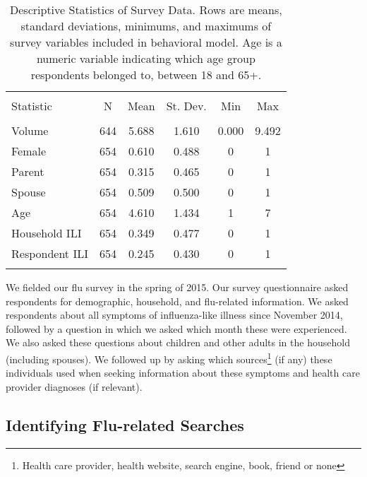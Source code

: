 \documentclass[fleqn,10pt]{wlscirep}
\begin{document}
\begin{table}[!htbp] \centering
\begin{tabular}{@{\extracolsep{5pt}}lccccc}
\\[-1.8ex]\hline
\hline \\[-1.8ex]
Statistic & \multicolumn{1}{c}{N} & \multicolumn{1}{c}{Mean} & \multicolumn{1}{c}{St. Dev.} & \multicolumn{1}{c}{Min} & \multicolumn{1}{c}{Max} \\
\hline \\[-1.8ex]
Volume & 644 & 5.688 & 1.610 & 0.000 & 9.492 \\
Female & 654 & 0.610 & 0.488 & 0 & 1 \\
Parent & 654 & 0.315 & 0.465 & 0 & 1 \\
Spouse & 654 & 0.509 & 0.500 & 0 & 1 \\
Age & 654 & 4.610 & 1.434 & 1 & 7 \\
Household ILI & 654 & 0.349 & 0.477 & 0 & 1 \\
Respondent ILI & 654 & 0.245 & 0.430 & 0 & 1 \\
\hline \\[-1.8ex]
\end{tabular}
  \caption{Descriptive Statistics of Survey Data. Rows are means, standard deviations, minimums, and maximums of survey variables included in behavioral model. Age is a numeric variable indicating which age group respondents belonged to, between 18 and 65+.}
\label{tab:descriptives}
\end{table}

We fielded our flu survey in the spring of 2015. Our survey questionnaire asked respondents for demographic, household, and flu-related information. We asked respondents about all symptoms of influenza-like illness since November 2014, followed by a question in which we asked which month these were experienced. We also asked these questions about children and other adults in the household (including spouses). We followed up by asking which sources\footnote{Health care provider, health website, search engine, book, friend or none} (if any) these individuals used when seeking information about these symptoms and health care provider diagnoses (if relevant).

\subsection*{Identifying Flu-related Searches}
\end{document}
